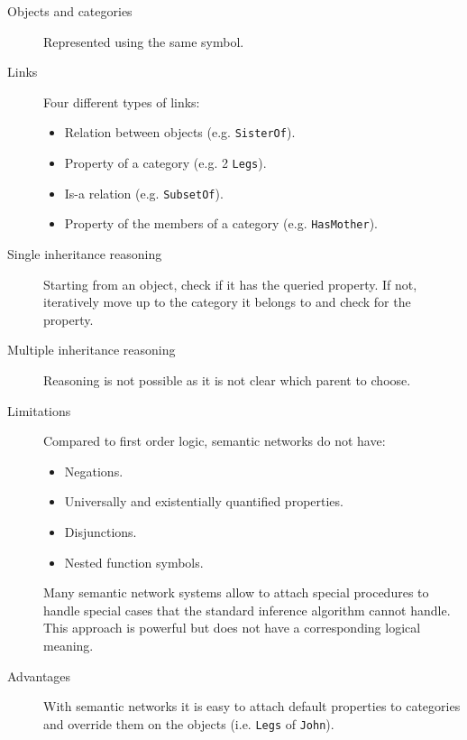 \begin{description}
    \item[Objects and categories] Represented using the same symbol.

    \item[Links] Four different types of links:
        \begin{itemize}
            \item Relation between objects (e.g. \texttt{SisterOf}).
            \item Property of a category (e.g. 2 \texttt{Legs}).
            \item Is-a relation (e.g. \texttt{SubsetOf}).
            \item Property of the members of a category (e.g. \texttt{HasMother}).
        \end{itemize} 
\end{description}

\begin{description}
    \item[Single inheritance reasoning] 
        Starting from an object, check if it has the queried property.
        If not, iteratively move up to the category it belongs to and check for the property.

    \item[Multiple inheritance reasoning] 
        Reasoning is not possible as it is not clear which parent to choose.
\end{description}

\begin{description}
    \item[Limitations]
        Compared to first order logic, semantic networks do not have:
        \begin{itemize}
            \item Negations.
            \item Universally and existentially quantified properties.
            \item Disjunctions.
            \item Nested function symbols.
        \end{itemize}

        Many semantic network systems allow to attach special procedures to handle special cases 
        that the standard inference algorithm cannot handle.
        This approach is powerful but does not have a corresponding logical meaning.

    \item[Advantages]
        With semantic networks it is easy to attach default properties to categories and
        override them on the objects (i.e. \texttt{Legs} of \texttt{John}).
\end{description}




